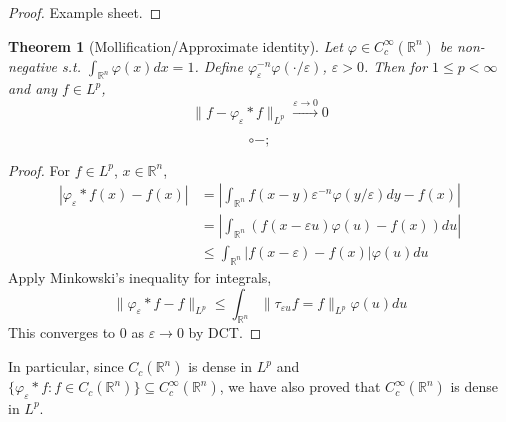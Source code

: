 \documentclass{article}
\theoremstyle{definition}
\theoremstyle{remark}
\theoremstyle{plain}
\newtheorem{thm}[defn]{Theorem}
\newcommand{\RR}{\mathbb{R}}
\begin{document}
\begin{proof}
    Example sheet.
\end{proof}
\begin{thm}[Mollification/Approximate identity]
    Let $\varphi\in C_c^\infty(\RR^n)$ be non-negative s.t. $\int_{\RR^n}\varphi(x)dx=1$. Define $\varphi_\varepsilon^{-n}\varphi(\cdot/\varepsilon)$, $\varepsilon>0$. Then for $1\le p<\infty$ and any $f\in L^p$,
    \[\|f-\varphi_\varepsilon\ast f\|_{L^p}\overset{\varepsilon\to0}{\longrightarrow} 0\]
\end{thm}
\[\circ-;\tag{Owen's signature}\]
\begin{proof}
    For $f\in L^p$, $x\in\RR^n$,
    \begin{align*}
        |\varphi_\varepsilon\ast f(x)-f(x)|&=\left|\int_{\RR^n}f(x-y)\varepsilon^{-n}\varphi(y/\varepsilon)dy-f(x)\right|\\
        &=\left|\int_{\RR^n}(f(x-\varepsilon u)\varphi(u)-f(x))du\right|\\
        &\le \int_{\RR^n}|f(x-\varepsilon)-f(x)|\varphi(u)du
    \end{align*}
    Apply Minkowski's inequality for integrals,
    \[\|\varphi_\varepsilon\ast f-f\|_{L^p}\le\int_{\RR^n}\|\tau_{\varepsilon u}f=f\|_{L^p}\varphi(u)du\]
    This converges to $0$ as $\varepsilon\to 0$ by DCT.
\end{proof}
In particular, since $C_c(\RR^n)$ is dense in $L^p$ and
$\{\varphi_\varepsilon\ast f:f\in C_c(\RR^n)\}\subseteq C_c^\infty(\RR^n)$, we have also proved that $C_c^\infty(\RR^n)$ is dense in $L^p$.
\end{document}
